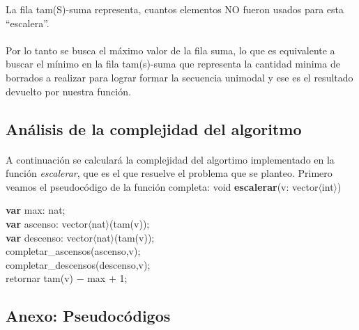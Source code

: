 La fila tam(S)-suma representa, cuantos elementos NO fueron usados para esta ``escalera''. 


\paragraph{}
Por lo tanto se busca el máximo valor de la fila suma, lo que es equivalente a buscar el mínimo en la fila tam(s)-suma que representa la cantidad minima de borrados a realizar para lograr formar la secuencia unimodal y ese es el resultado devuelto por nuestra función.



\subsection{Análisis de la complejidad del algoritmo}

\paragraph{}
A continuación se calculará la complejidad del algortimo implementado en la función \textit{escalerar}, que es el que resuelve el problema que se planteo. Primero veamos el pseudocódigo de la función completa:
\vspace*{30pt}
void \textbf{escalerar}(v: vector$\langle$int$\rangle$)\\
	\begin{algorithm}[H]
\BlankLine		
      \textbf{var} max: nat;\\
      \textbf{var} ascenso: vector$\langle$nat$\rangle$(tam(v));\\
      \textbf{var} descenso: vector$\langle$nat$\rangle$(tam(v));\\
\BlankLine		
      completar\_ascensos(ascenso,v);\\
      completar\_descensos(descenso,v);\\	
\BlankLine		
\BlankLine		
	retornar  tam(v) $-$ max $+$ 1;\\



\end{algorithm}




\subsection{Anexo: Pseudocódigos}
\label{pseudocodigos1}


